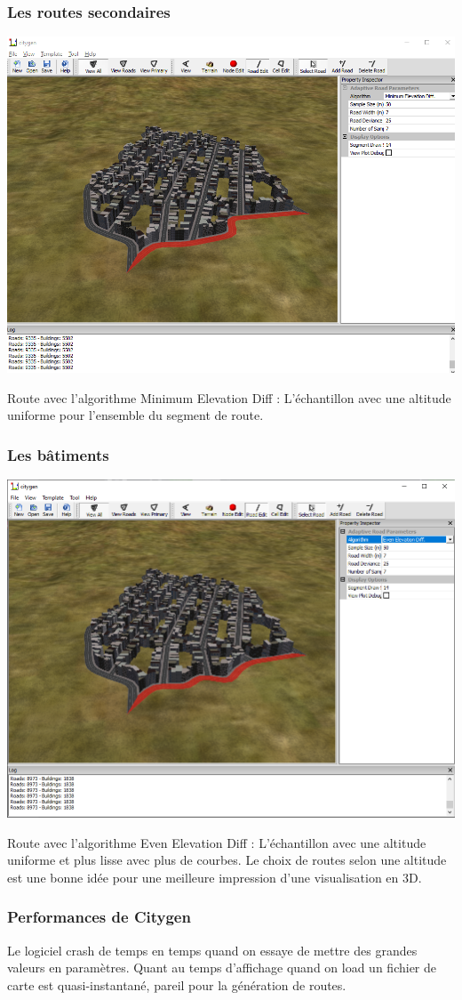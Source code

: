 \subsubsection{\textbf{Les routes secondaires}}

\begin{center}
\includegraphics[height = 5 cm]{images/figure6bis1.png}\\
\end{center}
Route avec l'algorithme Minimum Elevation Diff :
L'échantillon avec une altitude uniforme pour l'ensemble du segment de route.

\subsubsection{\textbf{Les bâtiments}}

\begin{center}
\includegraphics[height = 5 cm]{images/figure6bis2.png}\\
\end{center}
Route avec l'algorithme Even Elevation Diff :
L'échantillon avec une altitude uniforme et plus lisse avec plus de courbes.
Le choix de routes selon une altitude est une bonne idée pour une meilleure impression d'une visualisation en 3D.

\subsubsection{Performances de Citygen}
Le logiciel crash de temps en temps quand on essaye de mettre des grandes valeurs en paramètres. Quant au temps d’affichage quand on load un fichier de carte est quasi-instantané, pareil pour la génération de routes.
